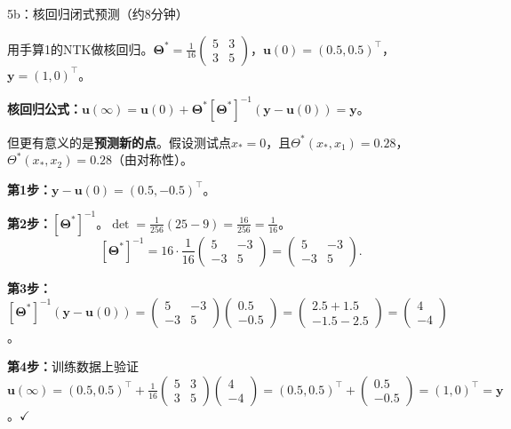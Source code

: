 \documentclass[11pt,a4paper]{article}
\newcommand{\bTheta}{\boldsymbol{\Theta}}
\newcommand{\bu}{\mathbf{u}}
\newcommand{\by}{\mathbf{y}}
\begin{document}
\begin{handcalc}{5b：核回归闭式预测（约8分钟）}

用手算1的NTK做核回归。$\bTheta^*=\frac{1}{16}\begin{pmatrix}5&3\\3&5\end{pmatrix}$，$\bu(0)=(0.5,0.5)^\top$，$\by=(1,0)^\top$。

\textbf{核回归公式：}$\bu(\infty) = \bu(0) + \bTheta^*[\bTheta^*]^{-1}(\by-\bu(0)) = \by$。

但更有意义的是\textbf{预测新的点}。假设测试点$x_*=0$，且$\Theta^*(x_*,x_1)=0.28$，$\Theta^*(x_*,x_2)=0.28$（由对称性）。

\tcblower

\textbf{第1步：}$\by-\bu(0)=(0.5,-0.5)^\top$。

\textbf{第2步：}$[\bTheta^*]^{-1}$。$\det=\frac{1}{256}(25-9)=\frac{16}{256}=\frac{1}{16}$。
\[
[\bTheta^*]^{-1} = 16\cdot\frac{1}{16}\begin{pmatrix}5&-3\\-3&5\end{pmatrix} = \begin{pmatrix}5&-3\\-3&5\end{pmatrix}.
\]

\textbf{第3步：}$[\bTheta^*]^{-1}(\by-\bu(0)) = \begin{pmatrix}5&-3\\-3&5\end{pmatrix}\begin{pmatrix}0.5\\-0.5\end{pmatrix} = \begin{pmatrix}2.5+1.5\\-1.5-2.5\end{pmatrix} = \begin{pmatrix}4\\-4\end{pmatrix}$。

\textbf{第4步：}训练数据上验证$\bu(\infty)=(0.5,0.5)^\top+\frac{1}{16}\begin{pmatrix}5&3\\3&5\end{pmatrix}\begin{pmatrix}4\\-4\end{pmatrix}=(0.5,0.5)^\top+\begin{pmatrix}0.5\\-0.5\end{pmatrix}=(1,0)^\top=\by$。$\checkmark$


\end{handcalc}
\end{document}
